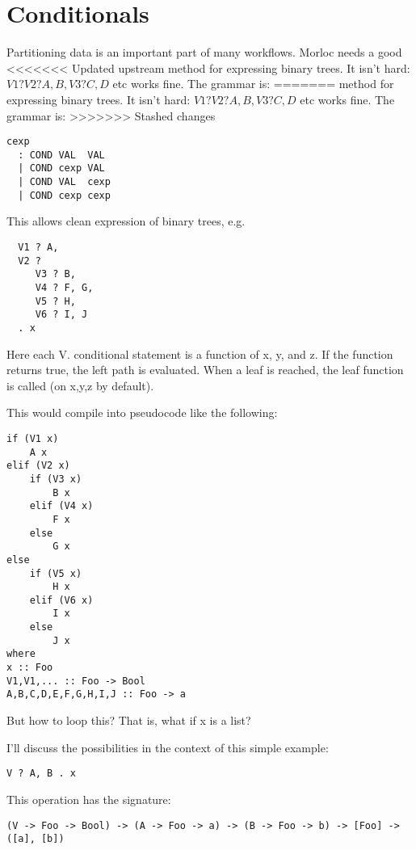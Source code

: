 \documentclass[12pt]{article}
\begin{document}
\section{Conditionals}

Partitioning data is an important part of many workflows. Morloc needs a good
<<<<<<< Updated upstream
method for expressing binary trees. It isn't hard: $V1 ? V2 ? A, B, V3 ? C, D$ etc
works fine. The grammar is:
=======
method for expressing binary trees. It isn't hard: $V1 ? V2 ? A, B, V3 ? C, D$
etc works fine. The grammar is:
>>>>>>> Stashed changes

\begin{verbatim}
cexp
  : COND VAL  VAL
  | COND cexp VAL
  | COND VAL  cexp
  | COND cexp cexp
\end{verbatim}

This allows clean expression of binary trees, e.g.

\begin{verbatim}
  V1 ? A,
  V2 ?
     V3 ? B,
     V4 ? F, G,
     V5 ? H,
     V6 ? I, J
  . x
\end{verbatim}

Here each V. conditional statement is a function of x, y, and z. If the
function returns true, the left path is evaluated. When a leaf is reached, the
leaf function is called (on x,y,z by default).

This would compile into pseudocode like the following:

\begin{verbatim}
if (V1 x)
    A x
elif (V2 x)
    if (V3 x)
        B x
    elif (V4 x)
        F x
    else
        G x
else
    if (V5 x)
        H x
    elif (V6 x)
        I x
    else
        J x
where
x :: Foo
V1,V1,... :: Foo -> Bool
A,B,C,D,E,F,G,H,I,J :: Foo -> a
\end{verbatim}

But how to loop this? That is, what if x is a list?

I'll discuss the possibilities in the context of this simple example:

\begin{verbatim}
V ? A, B . x
\end{verbatim}

This operation has the signature:

\begin{verbatim}
(V -> Foo -> Bool) -> (A -> Foo -> a) -> (B -> Foo -> b) -> [Foo] -> ([a], [b])
\end{verbatim}
\end{document}
